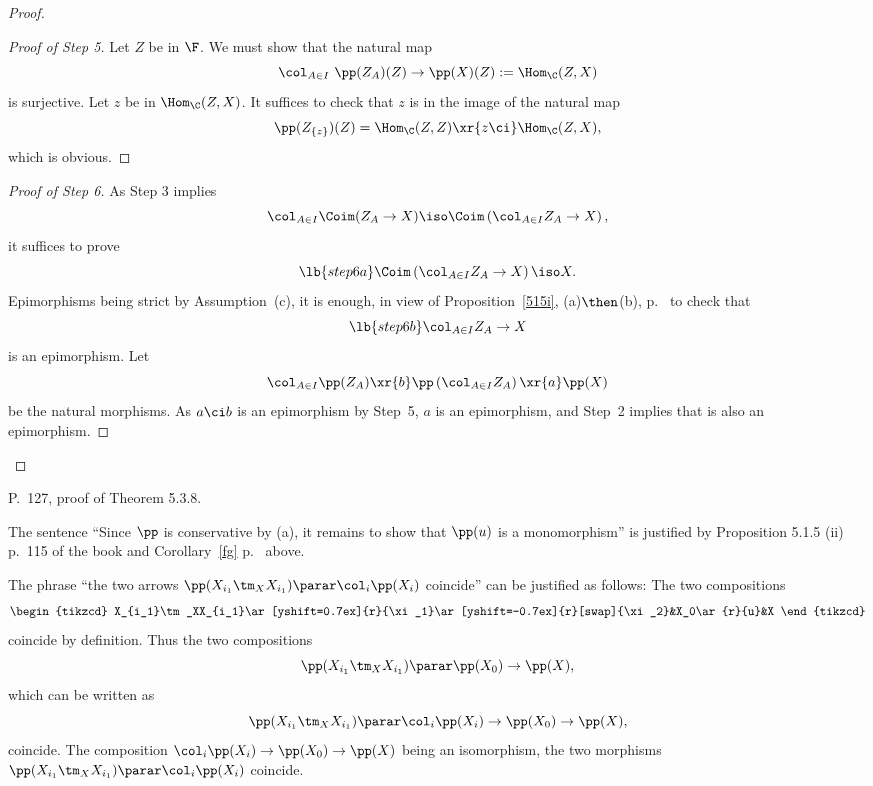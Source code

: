 \documentclass[12pt]{article}
\theoremstyle{remark}
\theoremstyle{definition}
\begin{document}
\begin{proof}
\begin{proof}[Proof of Step 5]
Let $Z$ be in $\F$. We must show that the natural map 
$$
\col_{A\in I}\ \pp(Z_A)(Z)\to\pp(X)(Z):=\Hom_\C(Z,X) 
$$
is surjective. Let $z$ be in $\Hom_\C(Z,X)$. It suffices to check that $z$ is in the image of the natural map 
$$
\pp(Z_{\{z\}})(Z)=\Hom_\C(Z,Z)\xr{z\ci}\Hom_\C(Z,X),
$$
which is obvious. 
\end{proof}

\begin{proof}[Proof of Step 6] 
As Step 3 implies 
$$
\col_{A\in I}\Coim(Z_A\to X)\iso\Coim\left(\col_{A\in I}Z_A\to X\right),
$$ 
it suffices to prove 
\begin{equation}\lb{step6a}
\Coim\left(\col_{A\in I}Z_A\to X\right)\iso X.
\end{equation} 
Epimorphisms being strict by Assumption~(c), it is enough, in view of Proposition~\ref{515i}, (a)$\then$(b), p.~ to check that 
\begin{equation}\lb{step6b}
\col_{A\in I}Z_A\to X
\end{equation} 
is an epimorphism. Let 
$$
\col_{A\in I}\pp(Z_A)\xr{b}\pp\left(\col_{A\in I}Z_A\right)\xr{a}\pp(X)
$$
be the natural morphisms. As $a\ci b$ is an epimorphism by Step~5, $a$ is an epimorphism, and Step~2 implies that  is also an epimorphism. 
\end{proof}
\end{proof}



\begin{s}
P.~127, proof of Theorem 5.3.8. 

The sentence ``Since $\pp$ is conservative by (a), it remains to show that $\pp(u)$ is a monomorphism'' is justified by Proposition 5.1.5 (ii) p.~115 of the book and Corollary~\ref{fg} p.~ above.

The phrase ``the two arrows $\pp(X_{i_1}\tm_XX_{i_1})\parar\col_i\pp(X_i)$ coincide'' can be justified as follows: The two compositions  
$$
\begin{tikzcd}
X_{i_1}\tm_XX_{i_1}\ar[yshift=0.7ex]{r}{\xi_1}\ar[yshift=-0.7ex]{r}[swap]{\xi_2}&X_0\ar{r}{u}&X
\end{tikzcd}
$$ 
coincide by definition. Thus the two compositions  
$$
\pp(X_{i_1}\tm_XX_{i_1})\parar\pp(X_0)\to\pp(X),
$$ 
which can be written as 
$$
\pp(X_{i_1}\tm_XX_{i_1})\parar\col_i\pp(X_i)\to\pp(X_0)\to\pp(X),
$$
coincide. The composition $\col_i\pp(X_i)\to\pp(X_0)\to\pp(X)$ being an isomorphism, the two morphisms $\pp(X_{i_1}\tm_XX_{i_1})\parar\col_i\pp(X_i)$ coincide.
\end{s}
\end{document}
